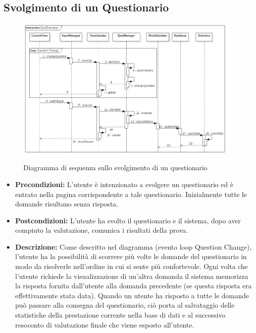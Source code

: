 \documentclass[a4paper,11pt]{article}
\begin{document}
	\subsection{Svolgimento di un Questionario}
	\begin{figure}[h!]
	\begin{center}
		\includegraphics[scale=0.5]{../images/QuizExecution.png}
		\caption{Diagramma di sequenza sullo svolgimento di un questionario}
	\end{center}
	\end{figure}
	\begin{itemize}
	\item\textbf{Precondizioni:} L'utente è intenzionato a svolgere un questionario ed è entrato nella pagina corrispondente a tale questionario. Inizialmente tutte le domande risultano senza risposta. \\ %
	\item\textbf{Postcondizioni:} L'utente ha svolto il questionario e il sistema, dopo aver compiuto la valutazione, comunica i risultati della prova.\\
	\item\textbf{Descrizione:} Come descritto nel diagramma (evento loop Question Change), l'utente ha la possibilità di scorrere più volte le domande del questionario in modo da risolverle nell'ordine in cui si sente più confortevole. Ogni volta che l'utente richiede la visualizzazione di un'altra domanda il sistema memorizza la risposta fornita dall'utente alla domanda precedente (se questa risposta era effettivamente stata data). Quando un utente ha risposto a tutte le domande può passare alla consegna del questionario, ciò porta al salvataggio delle statistiche della prestazione corrente nella base di dati e al successivo resoconto di valutazione finale che viene esposto all'utente.\\
	\end{itemize}
	\newpage
\end{document}
